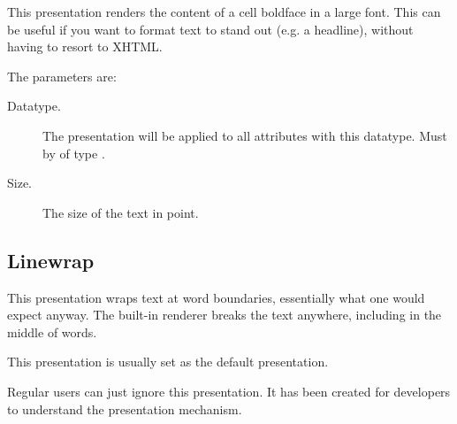 This presentation renders the content of a cell boldface in a large font.  This can be useful if
you want to format text to stand out (e.g. a headline), without having to resort to XHTML.

The parameters are:

\begin{description}
\item[Datatype.] The presentation will be applied to all attributes with this datatype.  Must by of type .
\item[Size.] The size of the text in point.
\end{description}

\subsection{Linewrap}

This presentation wraps text at word boundaries, essentially what one would expect anyway.  The built-in renderer breaks the text anywhere, including in the middle of words.

This presentation is usually set as the default presentation.

\begin{info}
Regular users can just ignore this presentation.  It has been created for developers to understand the presentation mechanism.
\end{info}

